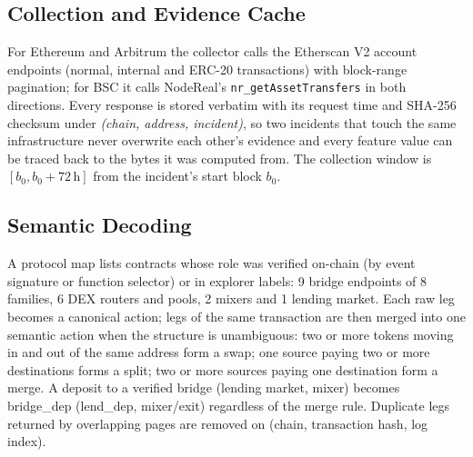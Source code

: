 \subsection{Collection and Evidence Cache}
For Ethereum and Arbitrum the collector calls the Etherscan V2 account endpoints (normal, internal and ERC-20 transactions) with block-range pagination; for BSC it calls NodeReal's \texttt{nr\_getAssetTransfers} in both directions.
Every response is stored verbatim with its request time and SHA-256 checksum under \emph{(chain, address, incident)}, so two incidents that touch the same infrastructure never overwrite each other's evidence and every feature value can be traced back to the bytes it was computed from.
The collection window is $[b_0, b_0+72\,\text{h}]$ from the incident's start block $b_0$.

\subsection{Semantic Decoding}
A protocol map lists contracts whose role was verified on-chain (by event signature or function selector) or in explorer labels: 9 bridge endpoints of 8 families, 6 DEX routers and pools, 2 mixers and 1 lending market.
Each raw leg becomes a canonical action; legs of the same transaction are then merged into one semantic action when the structure is unambiguous: two or more tokens moving in and out of the same address form a \textsf{swap}; one source paying two or more destinations forms a \textsf{split}; two or more sources paying one destination form a \textsf{merge}.
A deposit to a verified bridge (lending market, mixer) becomes \textsf{bridge\_dep} (\textsf{lend\_dep}, \textsf{mixer/exit}) regardless of the merge rule.
Duplicate legs returned by overlapping pages are removed on (chain, transaction hash, log index).

